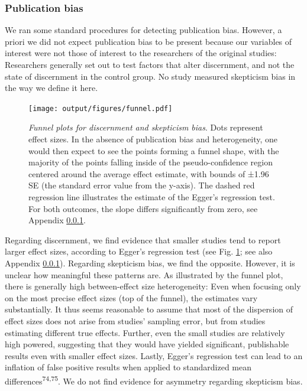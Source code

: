 \documentclass[
  man]{apa6}
\begin{document}
\subsubsection{Publication bias}\label{publication-bias}

We ran some standard procedures for detecting publication bias. However, a priori we did not expect publication bias to be present because our variables of interest were not those of interest to the researchers of the original studies: Researchers generally set out to test factors that alter discernment, and not the state of discernment in the control group. No study measured skepticism bias in the way we define it here.



\begin{figure}
\centering
\texttt{[image: output/figures/funnel.pdf]}
\caption{\label{fig:funnel}\emph{Funnel plots for discernment and skepticism bias}. Dots represent effect sizes. In the absence of publication bias and heterogeneity, one would then expect to see the points forming a funnel shape, with the majority of the points falling inside of the pseudo-confidence region centered around the average effect estimate, with bounds of ±1.96 SE (the standard error value from the y-axis). The dashed red regression line illustrates the estimate of the Egger's regression test. For both outcomes, the slope differs significantly from zero, see Appendix \ref{publication-bias}.}
\end{figure}

Regarding discernment, we find evidence that smaller studies tend to report larger effect sizes, according to Egger's regression test (see Fig. \ref{fig:funnel}; see also Appendix \ref{publication-bias}). Regarding skepticism bias, we find the opposite. However, it is unclear how meaningful these patterns are. As illustrated by the funnel plot, there is generally high between-effect size heterogeneity: Even when focusing only on the most precise effect sizes (top of the funnel), the estimates vary substantially. It thus seems reasonable to assume that most of the dispersion of effect sizes does not arise from studies' sampling error, but from studies estimating different true effects. Further, even the small studies are relatively high powered, suggesting that they would have yielded significant, publishable results even with smaller effect sizes. Lastly, Egger's regression test can lead to an inflation of false positive results when applied to standardized mean differences\textsuperscript{74,75}. We do not find evidence for asymmetry regarding skepticism bias.
\end{document}

